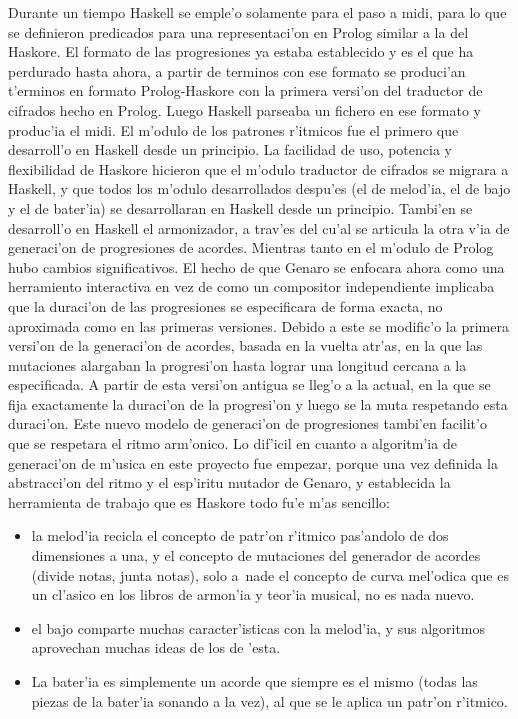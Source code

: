 \begin{itemize}
\newline
Durante un tiempo Haskell se emple'o solamente para el paso a midi, para lo que se definieron predicados para una representaci'on en Prolog similar a la del Haskore. El formato de las progresiones ya estaba establecido y es el que ha perdurado hasta ahora, a partir de terminos con ese formato se produci'an t'erminos en formato Prolog-Haskore con la primera versi'on del traductor de cifrados hecho en Prolog. Luego Haskell parseaba un fichero en ese formato y produc'ia el midi. El m'odulo de los patrones r'itmicos fue el primero que desarroll'o en Haskell desde un principio. La facilidad de uso, potencia y flexibilidad de Haskore hicieron que el m'odulo traductor de cifrados se migrara a Haskell, y que todos los m'odulo desarrollados despu'es (el de melod'ia, el de bajo y el de bater'ia) se desarrollaran en Haskell desde un principio. Tambi'en se desarroll'o en Haskell el armonizador, a trav'es del cu'al se articula la otra v'ia de generaci'on de progresiones de acordes.
\newline
Mientras tanto en el m'odulo de Prolog hubo cambios significativos. El hecho de que Genaro se enfocara ahora como una herramiento interactiva en vez de como un compositor independiente implicaba que la duraci'on de las progresiones se especificara de forma exacta, no aproximada como en las primeras versiones. Debido a este se modific'o la primera versi'on de la generaci'on de acordes, basada en la vuelta atr'as, en la que las mutaciones alargaban la progresi'on hasta lograr una longitud cercana a la especificada. A partir de esta versi'on antigua se lleg'o a la actual, en la que se fija exactamente la duraci'on de la progresi'on y luego se la muta respetando esta duraci'on. Este nuevo modelo de generaci'on de progresiones tambi'en facilit'o que se respetara el ritmo arm'onico.
\newline
Lo dif'icil en cuanto a algoritm'ia de generaci'on de m'usica en este proyecto fue empezar, porque una vez definida la abstracci'on del ritmo y el esp'iritu mutador de Genaro, y establecida la herramienta de trabajo que es Haskore todo fu'e m'as sencillo:
                \begin{itemize}
                \item la melod'ia recicla el concepto de patr'on r'itmico pas'andolo de dos dimensiones a una, y el concepto de mutaciones del generador de acordes (divide notas, junta notas), solo a~nade el concepto de curva mel'odica que es un cl'asico en los libros de armon'ia y teor'ia musical, no es nada nuevo. 
                \item el bajo comparte muchas caracter'isticas con la melod'ia, y sus algoritmos aprovechan muchas ideas de los de 'esta.
                \item La bater'ia es simplemente un acorde que siempre es el mismo (todas las piezas de la bater'ia sonando a la vez), al que se le aplica un patr'on r'itmico.
                \end{itemize}


\end{itemize}
